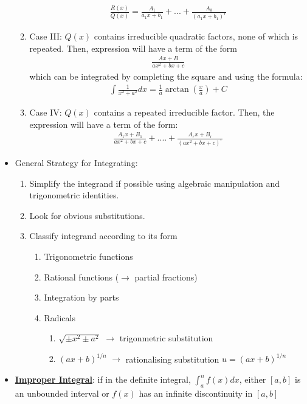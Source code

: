 \documentclass[reqno,11pt]{amsart}
\theoremstyle{definition}
\theoremstyle{remark}
\newcommand{\dfn}[1]{\underline{\textbf{#1}}}
\begin{document}
\begin{itemize}[noitemsep]
\begin{enumerate}[noitemsep]
		\begin{align}
			\frac{R(x)}{Q(x)} = \frac{A_1}{a_1 x + b_1}	 + ... + \frac{A_k}{(a_1 x + b_1)^r}
		\end{align}
		\item Case III: $Q(x)$ contains irreducible quadratic factors, none of which is repeated. Then, expression will have a term of the form
		\begin{align}
			\frac{Ax + B}{ax^2 + bx + c}	
		\end{align}
		which can be integrated by completing the square and using the formula: 
	\begin{align}
		\int \frac{1}{x^2 + a^2} dx = \frac{1}{a} \arctan \left( \frac{x}{a} \right) + C	
	\end{align}
	\item Case IV: $Q(x)$ contains a repeated irreducible factor. Then, the expression will have a term of the form: 
	\begin{align}
		\frac{A_1 x + B_1}{ax^2 + bx + c}	+ .... + \frac{
		A_r x + B_r}{(ax^2 + bx + c)^r}
	\end{align}
	\end{enumerate}
	\item General Strategy for Integrating: 
	\begin{enumerate}[noitemsep]
		\item Simplify the integrand if possible using algebraic manipulation and trigonometric identities. 
		\item Look for obvious substitutions. 
		\item Classify integrand according to its form
		\begin{enumerate}[noitemsep]
			\item Trigonometric functions
			\item Rational functions ($\rightarrow$ partial fractions) 
			\item Integration by parts
			\item Radicals
			\begin{enumerate}[noitemsep]
				\item $\sqrt{ \pm x^2 \pm a^2}$ $\rightarrow$ trigonmetric substitution 
				\item $(ax+b)^{1/n}$ $\rightarrow$ rationalising substitution $u = (ax+b)^{1/n}$
			\end{enumerate}
		\end{enumerate}
	\end{enumerate}
	\item \dfn{Improper Integral}: if in the definite integral, $\int_a^n f(x) dx$, either $[a,b]$ is an unbounded interval or $f(x)$ has an infinite discontinuity in $[a,b]$
\end{itemize}
\end{document}

